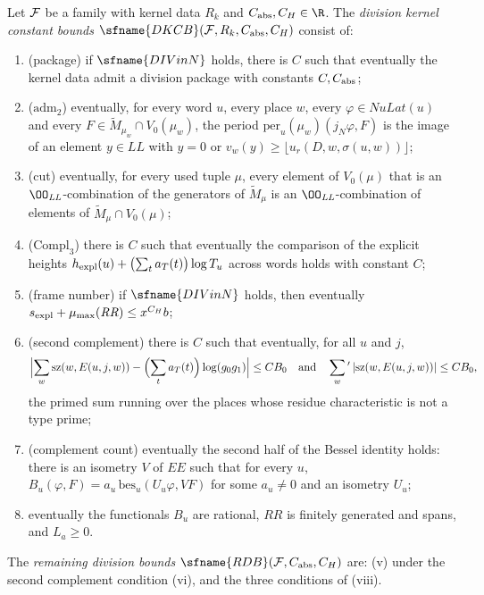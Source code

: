 \begin{definition}\label{pf:top-shape:dkcb}
Let $\mathcal{F}$ be a family with kernel data $R_k$ and $C_{\rm abs},C_H\in\R$. The \emph{division kernel constant
bounds} $\sfname{DKCB}(\topshapeF,R_k,C_{\rm abs},C_H)$ consist of:
\begin{enumerate}[label=(\roman*)]
\item (package) if $\sfname{DIVinN}$ holds, there is $C$ such that eventually the kernel data admit a division
package with constants $C,C_{\rm abs}$;
\item ($\mathrm{adm}_2$) eventually, for every word $u$, every place $w$, every $\varphi\in\mathit{NuLat}(u)$ and every
$F\in\widetilde M_{\mu_w}\cap V_0(\mu_w)$, the period $\mathrm{per}_u(\mu_w)(j_N\varphi,F)$ is the image of an
element $y\in\mathit{LL}$ with $y=0$ or $v_w(y)\ge\lfloor u_r(D,w,\sigma(u,w))\rfloor$;
\item (cut) eventually, for every used tuple $\mu$, every element of $V_0(\mu)$ that is an
$\OO_{\mathit{LL}}$-combination of the generators of $\widetilde M_\mu$ is an $\OO_{\mathit{LL}}$-combination of
elements of $\widetilde M_\mu\cap V_0(\mu)$;
\item ($\mathrm{Compl}_3$) there is $C$ such that eventually the comparison of the explicit heights
$h_{\rm expl}(u)+\bigl(\sum_ta_T(t)\bigr)\log T_u$ across words holds with constant $C$;
\item (frame number) if $\sfname{DIVinN}$ holds, then eventually $s_{\rm expl}+\mu_{\max}(\mathit{RR})\le x^{C_H}b$;
\item (second complement) there is $C$ such that eventually, for all $u$ and $j$,
\[
\Bigl|\sum_w\mathrm{sz}(w,E(u,j,w))-\Bigl(\sum_ta_T(t)\Bigr)\log(g_0g_1)\Bigr|\le CB_0\quad\text{and}\quad
\sum_{w}{}'\,|\mathrm{sz}(w,E(u,j,w))|\le CB_0,
\]
the primed sum running over the places whose residue characteristic is not a type prime;
\item (complement count) eventually the second half of the Bessel identity holds: there is an isometry $V$ of
$\mathit{EE}$ such that for every $u$, $B_u(\varphi,F)=a_u\,\mathrm{bes}_u(U_u\varphi,VF)$ for some $a_u\ne0$ and an
isometry $U_u$;
\item eventually the functionals $B_u$ are rational, $\mathit{RR}$ is finitely generated and spans, and $L_a\ge0$.
\end{enumerate}
The \emph{remaining division bounds} $\sfname{RDB}(\topshapeF,C_{\rm abs},C_H)$ are: (v) under the second
complement condition (vi), and the three conditions of (viii).
\end{definition}

